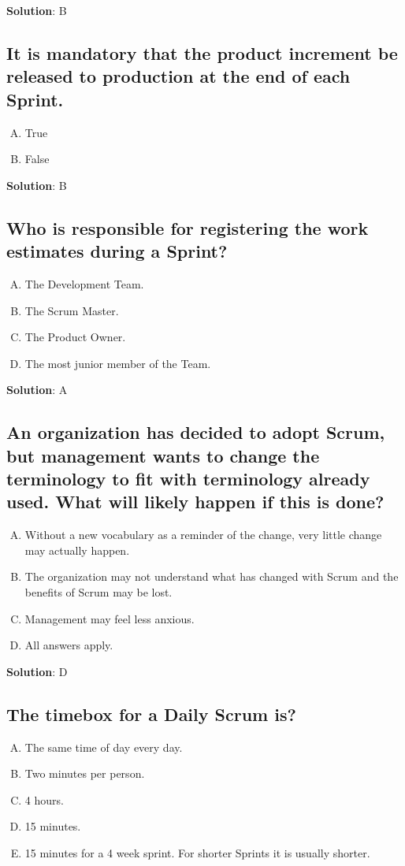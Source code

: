 \textbf{Solution}: B


\subsection{It is mandatory that the product increment be released to production at the end of each Sprint.}
\begin{enumerate}[A)]
  \item True
  \item False
\end{enumerate}


\textbf{Solution}: B


\subsection{Who is responsible for registering the work estimates during a Sprint?}
\begin{enumerate}[A)]
  \item The Development Team.
  \item The Scrum Master.
  \item The Product Owner.
  \item The most junior member of the Team.
\end{enumerate}


\textbf{Solution}: A


\subsection{An organization has decided to adopt Scrum, but management wants to change the terminology to fit with terminology already used. What will likely happen if this is done?}
\begin{enumerate}[A)]
  \item Without a new vocabulary as a reminder of the change, very little change may actually happen.
  \item The organization may not understand what has changed with Scrum and the benefits of Scrum may be lost.
  \item Management may feel less anxious.
  \item All answers apply.
\end{enumerate}


\textbf{Solution}: D


\subsection{The timebox for a Daily Scrum is?}
\begin{enumerate}[A)]
  \item The same time of day every day.
  \item Two minutes per person.
  \item 4 hours.
  \item 15 minutes.
  \item 15 minutes for a 4 week sprint. For shorter Sprints it is usually shorter.
\end{enumerate}



